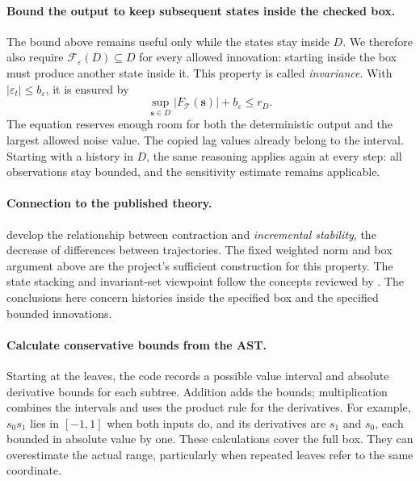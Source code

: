 \paragraph{Bound the output to keep subsequent states inside the checked box.}
The bound above remains useful only while the states stay inside $D$.
We therefore also require
$\mathcal F_\varepsilon(D)\subseteq D$ for every allowed innovation: starting
inside the box must produce another state inside it. This property is called
\emph{invariance}. With $|\varepsilon_t|\leq b_\varepsilon$, it is ensured by
\begin{equation}
 \sup_{\mathbf{s}\in D}|F_{\mathcal T}(\mathbf{s})|
       +b_\varepsilon\leq r_D.
 \label{eq:jacobian-domain-containment}
\end{equation}
The equation reserves enough room for both the deterministic output and the
largest allowed noise value. The copied lag values already belong to the
interval. Starting with a history in $D$, the same reasoning applies again
at every step: all observations stay bounded, and the sensitivity estimate
remains applicable.

\paragraph{Connection to the published theory.}
\citet[Definition~6 and Theorems~15--16]{tran2019convergence} develop the
relationship between contraction and \emph{incremental stability}, the
decrease of differences between trajectories. The fixed weighted norm and
box argument above are the project's sufficient construction for this
property. The state stacking and invariant-set viewpoint follow the concepts
reviewed by \citet{laraba2016setinvariance}. The conclusions here concern
histories inside the specified box and the specified bounded innovations.

\paragraph{Calculate conservative bounds from the AST.}
Starting at the leaves, the code records a possible value interval and
absolute derivative bounds for each subtree. Addition adds the bounds;
multiplication combines the intervals and uses the product rule for the
derivatives. For example, $s_0s_1$ lies in $[-1,1]$ when both inputs do, and
its derivatives are $s_1$ and $s_0$, each bounded in absolute value by one.
These calculations cover the full box. They can overestimate the actual
range, particularly when repeated leaves refer to the same coordinate.

